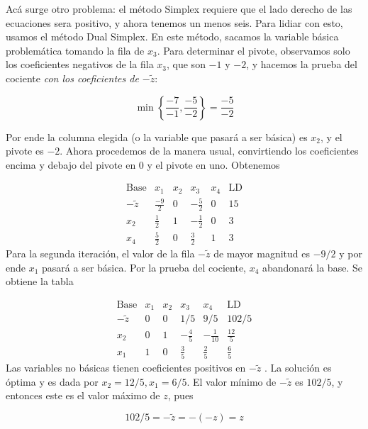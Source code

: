 \documentclass[12pt]{article}
\begin{document}
Acá surge otro problema: el método Simplex requiere que el lado derecho de las
ecuaciones sera positivo, y ahora tenemos un menos seis. Para lidiar con esto,
usamos el método Dual Simplex. En este método, sacamos la variable básica
problemática tomando la fila de $x_3$. Para determinar el pivote, observamos
solo los coeficientes negativos de la fila $x_3$, que son $-1$ y $-2$, y hacemos
la prueba del cociente \textit{con los coeficientes de $- \widetilde{ z } $}:

\begin{equation*}
    \min \left\{ \frac{-7}{-1}, \frac{-5}{-2} \right\} = \frac{-5}{-2}
\end{equation*}

Por ende la columna elegida (o la variable que pasará a ser básica) es $x_2$, y
el pivote es $-2$. Ahora procedemos de la manera usual, convirtiendo los
coeficientes encima y debajo del pivote en $0$ y el pivote en uno. Obtenemos


\[
\begin{array}{c|cccc|c}
\text{Base} & x_1 & x_2 & x_3 & x_4 & \text{LD}\\
\hline
-\tilde z & \frac{-9}{2} & 0 & -\frac{5}{2} & 0 & 15\\
x_2 & \frac{1}{2} & 1 & -\frac{1}{2} & 0 & 3\\
x_4 & \frac{5}{2} & 0 & \frac{3}{2} & 1 & 3
\end{array}
\]
Para la segunda iteración, el valor de la fila $-\widetilde{ z } $ de mayor
magnitud es $- 9 / 2$ y por ende $x_1$ pasará a ser básica. Por la prueba del
cociente, $x_4$ abandonará la base. Se obtiene la tabla


\[
\begin{array}{c|cccc|c}
\text{Base} & x_1 & x_2 & x_3 & x_4 & \text{LD}\\
\hline
-\tilde z & 0 & 0 & 1 / 5 & 9 / 5 & 102 / 5\\
x_2 & 0 & 1 & -\frac{4}{5} & -\frac{1}{10} & \frac{12}{5}\\
x_1 & 1 & 0 & \frac{3}{5} & \frac{2}{5} & \frac{6}{5}
\end{array}
\]
Las variables no básicas tienen coeficientes positivos en $-\widetilde{ z } $ .
La solución es óptima y es dada por $x_2 = 12 / 5, x_1 = 6 / 5$. El valor mínimo
de $-\widetilde{ z } $ es $102 / 5$, y entonces este es el valor máximo de $z$,
pues

\begin{equation*}
    102 / 5 = -\widetilde{ z }  = -(-z) = z
\end{equation*}
\end{document}
